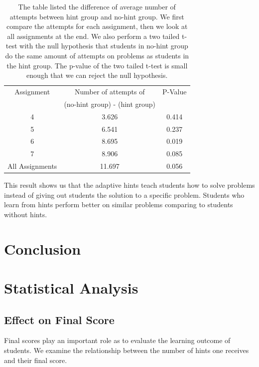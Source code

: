 \documentclass{article} %
\begin{document}
\begin{table}
\captionsetup{font=scriptsize}
\begin{center}
  \begin{tabular}{ c | c | c |}
   Assignment & Number of attempts of & P-Value \\
      & (no-hint group) - (hint group)  & \\ \hline
	4 & 3.626 & 0.414 \\
	5 & 6.541 & 0.237 \\
	6 & 8.695 & 0.019 \\
	7 & 8.906 & 0.085 \\ \hline
    All Assignments & 11.697 & 0.056 \\ 
    \hline
  \end{tabular}
  \caption{The table listed the difference of average number of attempts between hint group and no-hint group. We first compare the attempts for each assignment, then we look at all assignments at the end. We also perform a two tailed t-test with the null hypothesis that students in no-hint group do the same amount of attempts on problems as students in the hint group. The p-value of the two tailed t-test is small enough that we can reject the null hypothesis.}
  \label{tab:no_hint}
  \end{center}
\end{table}

This result shows us that the adaptive hints teach students how to solve problems instead of giving out students the solution to a specific problem. Students who learn from hints perform better on similar problems comparing to students without hints.

\section{Conclusion}
\newpage

\section{Statistical Analysis}

\subsection{Effect on Final Score}
Final scores play an important role as to evaluate the learning outcome of students. We examine the relationship between the number of hints one receives and their final score.
\end{document}

